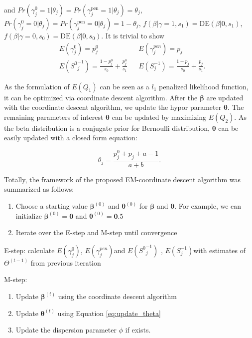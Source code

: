 \documentclass[AMA,STIX1COL,]{WileyNJD-v2}
\begin{document}
and
\(Pr(\gamma_{j}^{0} = 1|\theta_j) = Pr(\gamma_{j}^\text{pen}= 1|\theta_j) = \theta_j\),
\(Pr(\gamma_{j}^{0} = 0|\theta_j) = Pr(\gamma_{j}^\text{pen}= 0|\theta_j) = 1-\theta_j\),
\(f(\beta|\gamma=1, s_1) = \text{DE}(\beta|0 , s_1)\),
\(f(\beta|\gamma=0, s_0) = \text{DE}(\beta|0 , s_0)\). It is trivial to
show \[
\begin{aligned}
&E(\gamma^0_{j})  = p^0_{j} & &E(\gamma^{pen}_{j}) = p_{j}\\
&E({S^0}^{-1}_{j}) = \frac{1-p^{0}_{j}}{s_0} + \frac{p^{0}_{j}}{s_1} & &E(S^{-1}_{j}) = \frac{1-p_{j}}{s_0} + \frac{p_{j}}{s_1}.
\end{aligned}
\]

As the formulation of \(E(Q_1)\) can be seen as a \(l_1\) penalized
likelihood function, it can be optimized via coordinate descent
algorithm. After the \(\boldsymbol{\beta}\) are updated with the
coordinate descent algorithm, we update the hypor parameter
\(\boldsymbol{\theta}\). The remaining parameters of interest
\(\boldsymbol{\theta}\) can be updated by maximizing \(E(Q_2)\). As the
beta distribution is a conjugate prior for Bernoulli distribution,
\(\boldsymbol{\theta}\) can be easily updated with a closed form
equation:

\begin{equation}\label{eq:update_theta}
\theta_j = \frac{p^0_j + p_{j} + a - 1 }{a + b}.
\end{equation}

Totally, the framework of the proposed EM-coordinate descent algorithm
was summarized as follows:

\begin{enumerate}
\def\labelenumi{\arabic{enumi})}
\item
  Choose a starting value \(\boldsymbol{\beta}^{(0)}\) and
  \(\boldsymbol{\theta}^{(0)}\) for \(\boldsymbol{\beta}\) and
  \(\boldsymbol{\theta}\). For example, we can initialize
  \(\boldsymbol{\beta}^{(0)} = \boldsymbol{0}\) and
  \(\boldsymbol{\theta}^{(0)} = \boldsymbol{0}.5\)
\item
  Iterate over the E-step and M-step until convergence
\end{enumerate}

E-step: calculate \(E(\gamma^0_{j})\), \(E(\gamma^{pen}_{j})\)and
\(E({S^0}^{-1}_{j})\) , \(E({S}^{-1}_{j})\)with estimates of
\(\Theta^{(t-1)}\) from previous iteration

M-step:

\begin{enumerate}
\def\labelenumi{\alph{enumi})}
\item
  Update \(\boldsymbol{\beta}^{(t)}\) using the coordinate descent
  algorithm
\item
  Update \(\boldsymbol{\theta}^{(t)}\) using Equation
  \ref{eq:update_theta}
\item
  Update the dispersion parameter \(\phi\) if exists.
\end{enumerate}
\end{document}
